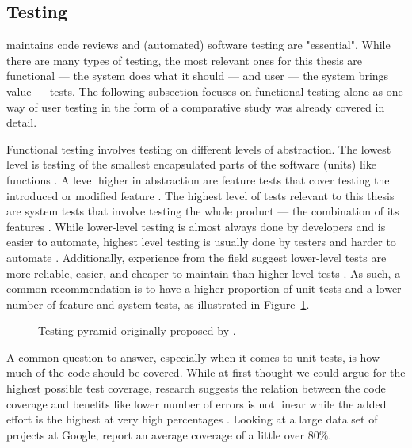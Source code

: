 \subsection{Testing}
\label{Literature-Software-Testing}

\textcite[Chapter~9]{Sommerville_2019} maintains code reviews and (automated) software testing are "essential".
While there are many types of testing, the most relevant ones for this thesis are functional --- the system does what it should --- and user --- the system brings value --- tests.
The following subsection focuses on functional testing alone as one way of user testing in the form of a comparative study was already covered in detail.

Functional testing involves testing on different levels of abstraction.
The lowest level is testing of the smallest encapsulated parts of the software (units) like functions \parencite[Chapter~9]{Sommerville_2019}.
A level higher in abstraction are feature tests that cover testing the introduced or modified feature \parencite[Chapter~9]{Sommerville_2019}.
The highest level of tests relevant to this thesis are system tests that involve testing the whole product --- the combination of its features \parencite[Chapter~9]{Sommerville_2019}.
While lower-level testing is almost always done by developers and is easier to automate, highest level testing is usually done by testers and harder to automate \parencite[Chapter~9]{Sommerville_2019}.
Additionally, experience from the field suggest lower-level tests are more reliable, easier, and cheaper to maintain than higher-level tests \parencites{cohn_succeeding_2010}{Wacker_2015}{Sommerville_2019}.
As such, a common recommendation is to have a higher proportion of unit tests and a lower number of feature and system tests, as illustrated in Figure~\ref{fig:testing-pyramid}.

\begin{figure}[H]
    \centering
    
    \caption{Testing pyramid originally proposed by \textcite{cohn_succeeding_2010}.}
    \label{fig:testing-pyramid}
\end{figure}

A common question to answer, especially when it comes to unit tests, is how much of the code should be covered.
While at first thought we could argue for the highest possible test coverage, research suggests the relation between the code coverage and benefits like lower number of errors is not linear while the added effort is the highest at very high percentages \parencite{Antinyan2018}.
Looking at a large data set of projects at Google, \textcite{Ivankovic_2019} report an average coverage of a little over 80\%.
